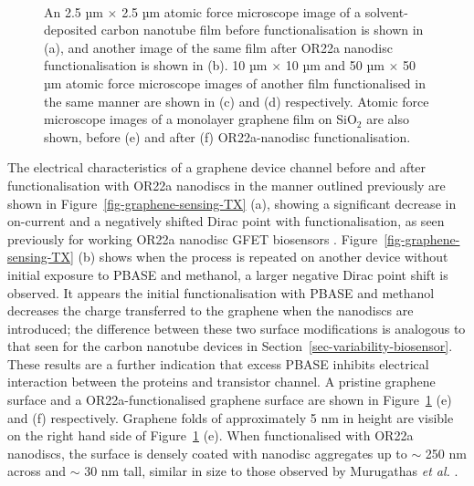 \documentclass[
  a4paper,
]{scrbook}
\begin{document}
\begin{figure}
\begin{minipage}[t]{0.01\linewidth}
{\centering 

~

}

\end{minipage}%

\caption[2.5 µm \(\times\) 2.5 µm, 10 µm \(\times\) 10 µm and 50 µm
\(\times\) 50 µm atomic force microscope images of a solvent-deposited
carbon nanotube film before and after OR22a nanodisc functionalisation,
alongside images of a monolayer graphene film before and after OR22a
nanodisc
functionalisation.]{\label{fig-solvent-deposited-AFM-comparison}An 2.5
µm \(\times\) 2.5 µm atomic force microscope image of a
solvent-deposited carbon nanotube film before functionalisation is shown
in (a), and another image of the same film after OR22a nanodisc
functionalisation is shown in (b). 10 µm \(\times\) 10 µm and 50 µm
\(\times\) 50 µm atomic force microscope images of another film
functionalised in the same manner are shown in (c) and (d) respectively.
Atomic force microscope images of a monolayer graphene film on SiO\(_2\)
are also shown, before (e) and after (f) OR22a-nanodisc
functionalisation.}

\end{figure}

The electrical characteristics of a graphene device channel before and
after functionalisation with OR22a nanodiscs in the manner outlined
previously are shown in Figure~\ref{fig-graphene-sensing-TX} (a),
showing a significant decrease in on-current and a negatively shifted
Dirac point with functionalisation, as seen previously for working OR22a
nanodisc GFET biosensors \autocite{Murugathas2020}.
Figure~\ref{fig-graphene-sensing-TX} (b) shows when the process is
repeated on another device without initial exposure to PBASE and
methanol, a larger negative Dirac point shift is observed. It appears
the initial functionalisation with PBASE and methanol decreases the
charge transferred to the graphene when the nanodiscs are introduced;
the difference between these two surface modifications is analogous to
that seen for the carbon nanotube devices in
Section~\ref{sec-variability-biosensor}. These results are a further
indication that excess PBASE inhibits electrical interaction between the
proteins and transistor channel. A pristine graphene surface and a
OR22a-functionalised graphene surface are shown in
Figure~\ref{fig-solvent-deposited-AFM-comparison} (e) and (f)
respectively. Graphene folds of approximately 5 nm in height are visible
on the right hand side of
Figure~\ref{fig-solvent-deposited-AFM-comparison} (e). When
functionalised with OR22a nanodiscs, the surface is densely coated with
nanodisc aggregates up to \(\sim\) 250 nm across and \(\sim\) 30 nm
tall, similar in size to those observed by Murugathas \emph{et al.}
\autocite{Murugathas2020}.
\end{document}
